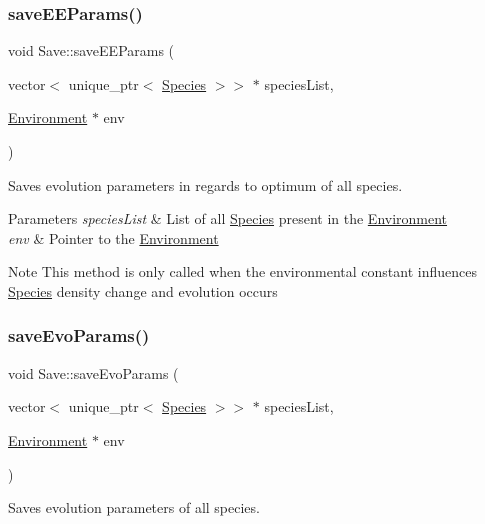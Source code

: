 \subsubsection{\texorpdfstring{save\+E\+E\+Params()}{saveEEParams()}}
{\footnotesize\ttfamily void Save\+::save\+E\+E\+Params (\begin{DoxyParamCaption}\item[{vector$<$ unique\+\_\+ptr$<$ \hyperlink{classSpecies}{Species} $>$$>$ $\ast$}]{species\+List,  }\item[{\hyperlink{classEnvironment}{Environment} $\ast$}]{env }\end{DoxyParamCaption})}



Saves evolution parameters in regards to optimum of all species. 


\begin{DoxyParams}{Parameters}
{\em species\+List} & List of all \hyperlink{classSpecies}{Species} present in the \hyperlink{classEnvironment}{Environment} \\
\hline
{\em env} & Pointer to the \hyperlink{classEnvironment}{Environment}\\
\hline
\end{DoxyParams}
\begin{DoxyNote}{Note}
This method is only called when the environmental constant influences \hyperlink{classSpecies}{Species} density change and evolution occurs 
\end{DoxyNote}
\hypertarget{classSave_a793a85379317ce9e5a08f7155a990fa8}{}\label{classSave_a793a85379317ce9e5a08f7155a990fa8} 
\subsubsection{\texorpdfstring{save\+Evo\+Params()}{saveEvoParams()}}
{\footnotesize\ttfamily void Save\+::save\+Evo\+Params (\begin{DoxyParamCaption}\item[{vector$<$ unique\+\_\+ptr$<$ \hyperlink{classSpecies}{Species} $>$$>$ $\ast$}]{species\+List,  }\item[{\hyperlink{classEnvironment}{Environment} $\ast$}]{env }\end{DoxyParamCaption})}



Saves evolution parameters of all species. 


